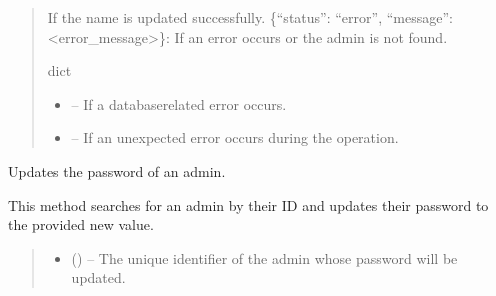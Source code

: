 \documentclass[letterpaper,10pt,english]{sphinxmanual}
\begin{document}
\begin{fulllineitems}
\begin{fulllineitems}
\begin{quote}
\begin{description}
\begin{description}
\begin{itemize}
\end{itemize}

\sphinxAtStartPar
If the name is updated successfully.
\sphinxhyphen{} \{“status”: “error”, “message”: <error\_message>\}:
If an error occurs or the admin is not found.

\end{description}


\sphinxAtStartPar
dict

\begin{itemize}
\item {} 
\sphinxAtStartPar
{} – If a database\sphinxhyphen{}related error occurs.

\item {} 
\sphinxAtStartPar
{} – If an unexpected error occurs during the operation.

\end{itemize}

\end{description}\end{quote}

\end{fulllineitems}


\begin{fulllineitems}
\label{\detokenize{app.controllers:app.controllers.admin_controller.AdminController.updateAdminPassword}}
\pysigstartsignatures
\pysiglinewithargsret
{}
{\sphinxparamcomma {}\sphinxparamcomma {}}
{}
\pysigstopsignatures
\sphinxAtStartPar
Updates the password of an admin.

\sphinxAtStartPar
This method searches for an admin by their ID and updates their password to the provided new value.
\begin{quote}\begin{description}
\begin{itemize}
\item {} 
\sphinxAtStartPar
{} () – The unique identifier of the admin whose password will be updated.


\end{itemize}
\end{description}
\end{quote}
\end{fulllineitems}
\end{fulllineitems}
\end{document}
